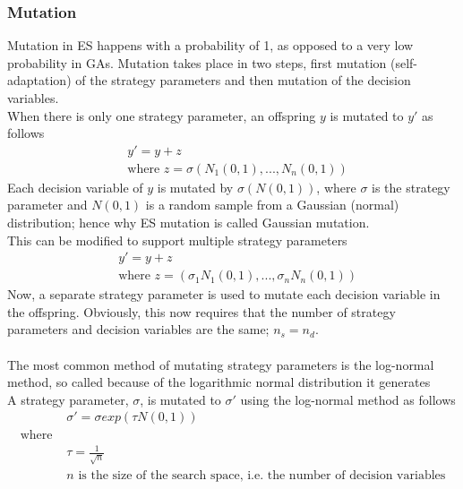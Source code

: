 \subsubsection{Mutation}
\label{sec:es_mutation}
Mutation in ES happens with a probability of 1, as opposed to a very low probability in GAs. Mutation takes place in two steps, first mutation (self-adaptation) of the strategy parameters and then mutation of the decision variables.
\\When there is only one strategy parameter, an offspring $y$ is mutated to $y'$ as follows\cite{4-es, es}
\begin{equation}
  \begin{split}
    &y' = y + z \\
    &\text{where } z = \sigma(N_{1}(0, 1), ..., N_{n}(0, 1))
  \end{split}
\end{equation}
Each decision variable of $y$ is mutated by $\sigma(N(0, 1))$, where $\sigma$ is the strategy parameter and $N(0, 1)$ is a random sample from a Gaussian (normal) distribution; hence why ES mutation is called Gaussian mutation.
\\This can be modified to support multiple strategy parameters\cite{4-es, es}
\begin{equation}
  \begin{split}
    &y' = y + z \\
    &\text{where } z = (\sigma_{1}N_{1}(0, 1), ..., \sigma_{n}N_{n}(0, 1))
  \end{split}
\end{equation}
Now, a separate strategy parameter is used to mutate each decision variable in the offspring. Obviously, this now requires that the number of strategy parameters and decision variables are the same; $n_{s} = n_{d}$.
\\\\The most common method of mutating strategy parameters is the log-normal method, so called because of the logarithmic normal distribution it generates
\\A strategy parameter, $\sigma$, is mutated to $\sigma'$ using the log-normal method as follows\cite{4-es, es}
\begin{equation}
  \begin{split}
    &\sigma' = \sigma exp(\tau N(0, 1)) \\
    \text{where } \\
    &\tau = \frac{1}{\sqrt{n}} \\
    &n \text{ is the size of the search space, i.e. the number of decision variables}
  \end{split}
\end{equation}
